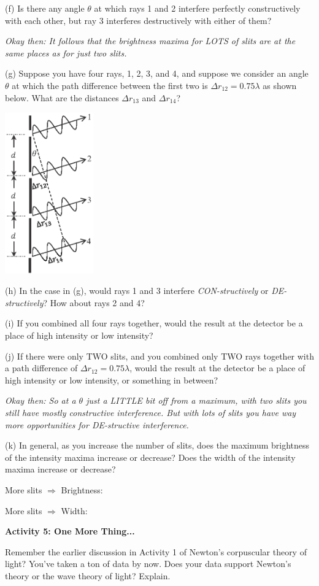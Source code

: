 (f) Is there any angle $\theta$ at which rays 1 and 2 interfere perfectly constructively with each other,  but ray 3 interferes destructively with either of them?
\answerspace{0.3in}

\textit{Okay then: It follows that the brightness maxima for LOTS of slits are at the same places as for just two slits.}

\pagebreak[2]
(g) Suppose you have four rays, 1, 2, 3, and 4, and suppose we consider an angle $\theta$ at which the path difference between the first two is $\Delta r_{12} = 0.75\lambda$ as shown below.  What are the distances $\Delta r_{13}$ and $\Delta r_{14}$?

\hspace{0.5in}\includegraphics[width=1.5in]{interference_of_light/four_slits.eps}

(h) In the case in (g), would rays 1 and 3 interfere \textit{CON-structively} or \textit{DE-structively}?  How about rays 2 and 4?
\answerspace{0.6in}

(i) If you combined all four rays together, would the result at the detector be a place of high intensity or low intensity? 
\answerspace{0.4in}

(j) If there were only TWO slits, and you combined only TWO rays together with a path difference of $\Delta r_{12} = 0.75\lambda$, would the result at the detector be a place of high intensity or low intensity, or something in between? 
\answerspace{0.6in}

\textit{Okay then: So at a $\theta$ just a LITTLE bit off from a maximum, with two slits you still have mostly constructive interference.  But with lots of slits you have way more opportunities for DE-structive interference.}

(k) In general, as you increase the number of slits, does the maximum brightness of the intensity maxima increase or decrease? Does the width of the intensity maxima increase or decrease?


\medskip
\hspace{0.5in} More slits $\Longrightarrow$ Brightness:
\medskip

\hspace{0.5in} More slits $\Longrightarrow$ Width:
\medskip


\textbf{Activity 5: One More Thing...}

Remember the earlier discussion in Activity 1 of Newton's corpuscular theory of
light? You've taken a ton of data by now.  Does your data support Newton's theory or the wave theory of light?
Explain.
\answerspace{1.0in}
